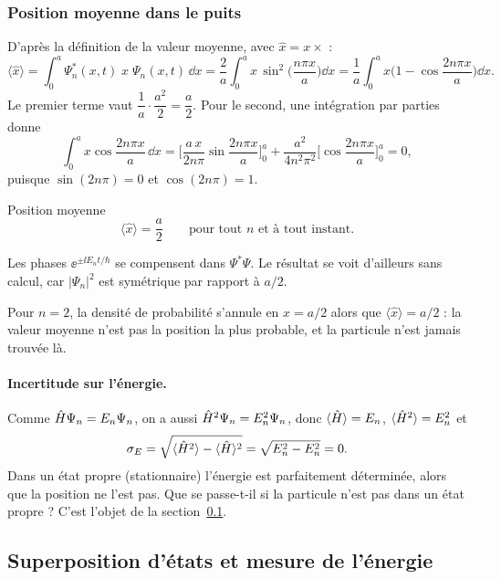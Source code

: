\subsubsection{Position moyenne dans le puits}

D'après la définition de la valeur moyenne, avec $\hat x=x\times$ :
\[
  \langle\hat x\rangle
  = \int_0^a\Psi_n^*(x,t)\;x\;\Psi_n(x,t)\,\dd x
  = \frac{2}{a}\int_0^a x\,\sin^2\!\Big(\frac{n\pi x}{a}\Big)\dd x
  = \frac{1}{a}\int_0^a x\Big(1-\cos\frac{2n\pi x}{a}\Big)\dd x .
\]
Le premier terme vaut $\dfrac1a\cdot\dfrac{a^2}{2}=\dfrac a2$. Pour le second, une
intégration par parties donne
\[
  \int_0^a x\cos\frac{2n\pi x}{a}\,\dd x
  =\Big[\frac{a\,x}{2n\pi}\sin\frac{2n\pi x}{a}\Big]_0^a
   +\frac{a^2}{4n^2\pi^2}\Big[\cos\frac{2n\pi x}{a}\Big]_0^a = 0,
\]
puisque $\sin(2n\pi)=0$ et $\cos(2n\pi)=1$.

\begin{resultat}{Position moyenne}
\[
  \langle\hat x\rangle=\frac{a}{2}\qquad\text{pour tout }n\text{ et à tout instant.}
\]
\end{resultat}

Les phases $\ee^{\pm\ii E_nt/\hbar}$ se compensent dans $\Psi^*\Psi$. Le résultat se
voit d'ailleurs sans calcul, car $|\Psi_n|^2$ est symétrique par rapport à $a/2$.

\begin{remarque}
Pour $n=2$, la densité de probabilité s'annule en $x=a/2$ alors que
$\langle\hat x\rangle=a/2$ : la valeur moyenne n'est pas la position la plus
probable, et la particule n'est jamais trouvée là.
\end{remarque}

\paragraph{Incertitude sur l'énergie.} Comme $\hat{H}\Psi_n=E_n\Psi_n$, on a aussi
$\hat{H}^{2}\Psi_n=E_n^2\Psi_n$, donc $\langle\hat{H}\rangle=E_n$, $\langle\hat{H}^{2}\rangle=E_n^2$
et
\[
  \sigma_E=\sqrt{\langle\hat{H}^{2}\rangle-\langle\hat{H}\rangle^2}=\sqrt{E_n^2-E_n^2}=0 .
\]
Dans un état propre (stationnaire) l'énergie est parfaitement déterminée, alors que la
position ne l'est pas. Que se passe-t-il si la particule n'est pas dans un état propre ?
C'est l'objet de la section~\ref{sec:superposition}.

\subsection{Superposition d'états et mesure de l'énergie}\label{sec:superposition}

